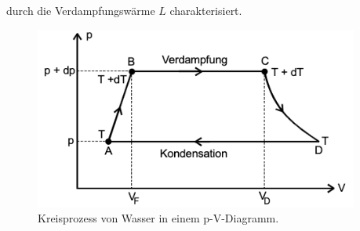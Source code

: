 durch die Verdampfungswärme $L$ charakterisiert. 
\begin{figure}[H]
    \centering
    \includegraphics[width=0.95\textwidth]{Kreisprozess.png}
    \caption{Kreisprozess von Wasser in einem p-V-Diagramm. \cite{anleitungV203}}
    \label{fig:Kreisprozess}
\end{figure}
